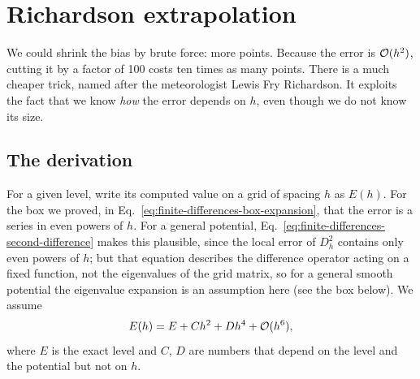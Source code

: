 \section{Richardson extrapolation}\label{sec:finite-differences-richardson}

We could shrink the bias by brute force: more points. Because the error is $\mathcal{O}(h^2)$, cutting it by a factor of 100 costs ten times as many points. There is a much cheaper trick, named after the meteorologist Lewis Fry Richardson. It exploits the fact that we know \emph{how} the error depends on $h$, even though we do not know its size.

\subsection{The derivation}

For a given level, write its computed value on a grid of spacing $h$ as $E(h)$. For the box we proved, in Eq.~\eqref{eq:finite-differences-box-expansion}, that the error is a series in even powers of $h$. For a general potential, Eq.~\eqref{eq:finite-differences-second-difference} makes this plausible, since the local error of $D_h^2$ contains only even powers of $h$; but that equation describes the difference operator acting on a fixed function, not the eigenvalues of the grid matrix, so for a general smooth potential the eigenvalue expansion is an assumption here (see the box below). We assume
\begin{equation}
E(h)=E+Ch^2+Dh^4+\mathcal{O}(h^6),
\label{eq:finite-differences-error-series}
\end{equation}
where $E$ is the exact level and $C$, $D$ are numbers that depend on the level and the potential but not on $h$.

